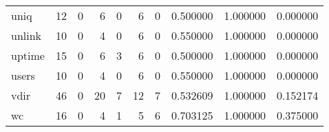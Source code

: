 \begin{longtable}{lrrrrrrrrr}
uniq      &                                       12 &                                                  0 &                                                  6 &                                                  0 &                                                  6 &                                                  0 &                                           0.500000 &                               1.000000 &                             0.000000 \\
unlink    &                                       10 &                                                  0 &                                                  4 &                                                  0 &                                                  6 &                                                  0 &                                           0.550000 &                               1.000000 &                             0.000000 \\
uptime    &                                       15 &                                                  0 &                                                  6 &                                                  3 &                                                  6 &                                                  0 &                                           0.500000 &                               1.000000 &                             0.000000 \\
users     &                                       10 &                                                  0 &                                                  4 &                                                  0 &                                                  6 &                                                  0 &                                           0.550000 &                               1.000000 &                             0.000000 \\
vdir      &                                       46 &                                                  0 &                                                 20 &                                                  7 &                                                 12 &                                                  7 &                                           0.532609 &                               1.000000 &                             0.152174 \\
wc        &                                       16 &                                                  0 &                                                  4 &                                                  1 &                                                  5 &                                                  6 &                                           0.703125 &                               1.000000 &                             0.375000 \\

\end{longtable}

